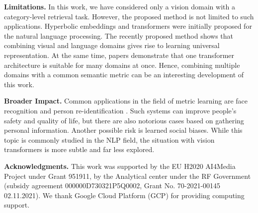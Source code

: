 \documentclass[10pt,twocolumn,letterpaper]{article}
\begin{document}
{\bf Limitations.}
In this work, we have considered only a vision domain with a category-level retrieval task. However, the proposed method is not limited to such applications. Hyperbolic embeddings \cite{nickel2017poincare} and transformers \cite{attention} were initially proposed for the natural language processing. The recently proposed method \cite{openai_clip} shows that combining visual and language domains gives rise to learning universal representation. At the same time, papers \cite{perceiver,lu2021pretrained} demonstrate that one transformer architecture is suitable for many domains at once. Hence, combining multiple domains with a common semantic metric can be an interesting development of this work.

{\bf Broader Impact.}
Common applications in the field of metric learning are face recognition \cite{sphereface,facenet} and person re-identification \cite{chen2017triplet,xiao2017joint}. Such systems can improve people's safety and quality of life, but there are also notorious cases based on gathering personal information. Another possible risk is learned social biases. While this topic is commonly studied in the NLP field, the situation with vision transformers is more subtle and far less explored.


{\bf Acknowledgments. }
This work was supported by the EU H2020 AI4Media Project under Grant 951911, by the Analytical center under the RF Government (subsidy agreement 000000D730321P5Q0002, Grant No. 70-2021-00145 02.11.2021). We thank Google Cloud Platform (GCP) for providing computing support.

{\small


}
\end{document}
